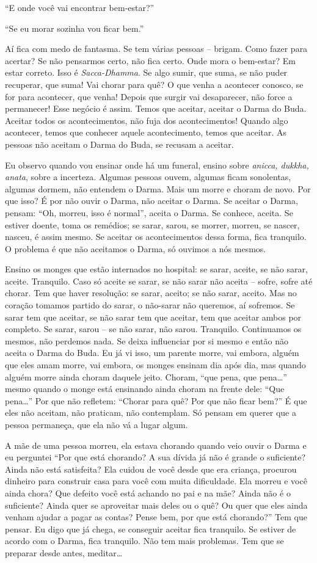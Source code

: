 “E onde você vai encontrar bem-estar?”

“Se eu morar sozinha vou ficar bem.”

Aí fica com medo de fantasma. Se tem várias pessoas – brigam. Como
fazer para acertar? Se não pensarmos certo, não fica certo. Onde mora o
bem-estar? Em estar correto. Isso é \textit{Sacca-Dhamma}. Se algo
sumir, que suma, se não puder recuperar, que suma! Vai chorar para quê?
O que venha a acontecer conosco, se for para acontecer, que venha!
Depois que surgir vai desaparecer, não force a permanecer! Esse negócio
é assim. Temos que aceitar, aceitar o Darma do Buda. Aceitar todos os
acontecimentos, não fuja dos acontecimentos! Quando algo acontecer,
temos que conhecer aquele acontecimento, temos que aceitar. As pessoas
não aceitam o Darma do Buda, se recusam a aceitar. 

Eu observo quando vou ensinar onde há um funeral, ensino sobre
\textit{anicca, dukkha, anata}, sobre a incerteza. Algumas pessoas
ouvem, algumas ficam sonolentas, algumas dormem, não entendem o Darma.
Mais um morre e choram de novo. Por que isso? É por não ouvir o Darma,
não aceitar o Darma. Se aceitar o Darma, pensam: “Oh, morreu, isso é
normal”, aceita o Darma. Se conhece, aceita. Se estiver doente, toma os
remédios; se sarar, sarou, se morrer, morreu, se nascer, nasceu, é
assim mesmo. Se aceitar os acontecimentos dessa forma, fica tranquilo.
O problema é que não aceitamos o Darma, só ouvimos a nós mesmos.

Ensino os monges que estão internados no hospital: se sarar, aceite,
se não sarar, aceite. Tranquilo. Caso só aceite se sarar, se não sarar
não aceita – sofre, sofre até chorar. Tem que haver resolução: se
sarar, aceito; se não sarar, aceito. Mas no coração tomamos partido do
sarar, o não-sarar não queremos, aí sofremos. Se sarar tem que aceitar,
se não sarar tem que aceitar, tem que aceitar ambos por completo. Se
sarar, sarou – se não sarar, não sarou. Tranquilo. Continuamos os
mesmos, não perdemos nada. Se deixa influenciar por si mesmo e então
não aceita o Darma do Buda. Eu já vi isso, um parente morre, vai
embora, alguém que eles amam morre, vai embora, os monges ensinam dia
após dia, mas quando alguém morre ainda choram daquele jeito. Choram,
“que pena, que pena…” mesmo quando o monge está ensinando ainda choram
na frente dele: “Que pena…” Por que não refletem: “Chorar para quê? Por
que não ficar bem?” É que eles não aceitam, não praticam, não
contemplam. Só pensam em querer que a pessoa permaneça, que ela não vá
a lugar algum.

A mãe de uma pessoa morreu, ela estava chorando quando veio ouvir o
Darma e eu perguntei “Por que está chorando? A sua dívida já não é
grande o suficiente? Ainda não está satisfeita? Ela cuidou de você
desde que era criança, procurou dinheiro para construir casa para você
com muita dificuldade. Ela morreu e você ainda chora? Que defeito você
está achando no pai e na mãe? Ainda não é o suficiente? Ainda quer se
aproveitar mais deles ou o quê? Ou quer que eles ainda venham ajudar a
pagar as contas? Pense bem, por que está chorando?” Tem que pensar. Eu
digo que já chega, se conseguir aceitar fica tranquilo. Se estiver de
acordo com o Darma, fica tranquilo. Não tem mais problemas. Tem que se
preparar desde antes, meditar…

